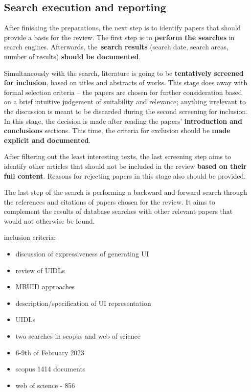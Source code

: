 \subsection{Search execution and reporting}\label{subsec:search-execution-and-reporting}

After finishing the preparations, the next step is to identify papers that should provide a basis for the review.
The first step is to \textbf{perform the searches} in search engines.
Afterwards, the\ \textbf{search results} (search date, search areas, number of results) \textbf{should be documented}.

Simultaneously with the search, literature is going to be \textbf{tentatively screened for inclusion}, based on titles and abstracts of works.
This stage does away with formal selection criteria -- the papers are chosen for further consideration based on a brief intuitive judgement of suitability and relevance;
anything irrelevant to the discussion is meant to be discarded during the second screening for inclusion.
In this stage, the decision is made after reading the papers' \textbf{introduction and conclusions} sections.
This time, the criteria for exclusion should be \textbf{made explicit and documented}.

After filtering out the least interesting texts, the last screening step aims to identify other articles
that should not be included in the review \textbf{based on their full content}.
Reasons for rejecting papers in this stage also should be provided.

The last step of the search is performing a backward and forward search through the references and citations of papers chosen for the review.
It aims to complement the results of database searches with other relevant papers that would not otherwise be found.


inclusion criteria:
\begin{itemize}
    \item discussion of expressiveness of generating UI
    \item review of UIDLs
    \item MBUID approaches
    \item description/specification of UI representation
    \item UIDLs
\end{itemize}

\begin{itemize}
    \item two searches in scopus and web of science
    \item 6-9th of February 2023
    \item scopus 1414 documents
    \item web of science - 856
\end{itemize}

